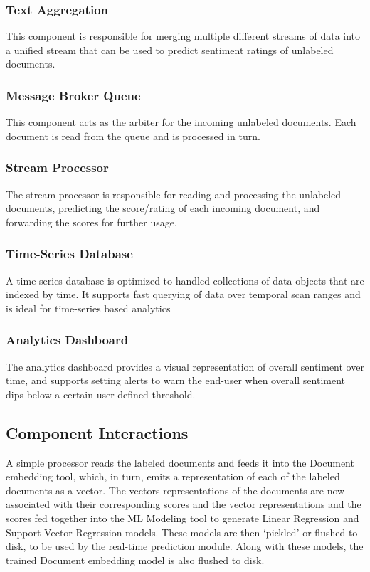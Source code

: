 \documentclass[conference]{IEEEtran}
\begin{document}
        \subsubsection{Text Aggregation}
            This component is responsible for merging multiple different streams of data into a unified stream that can be used to predict sentiment ratings of unlabeled documents.

        \subsubsection{Message Broker Queue}
            This component acts as the arbiter for the incoming unlabeled documents. 
            Each document is read from the queue and is processed in turn.

        \subsubsection{Stream Processor}
            The stream processor is responsible for reading and processing the unlabeled documents, predicting the score/rating of each incoming document, and forwarding the scores for further usage.

        \subsubsection{Time-Series Database}
            A time series database is optimized to handled collections of data objects that are indexed by time. 
            It supports fast querying of data over temporal scan ranges and is ideal for time-series based analytics

        \subsubsection{Analytics Dashboard}
            The analytics dashboard provides a visual representation of overall sentiment over time, and supports setting alerts to warn the end-user when overall sentiment dips below a certain user-defined threshold.

    \subsection{Component Interactions} \label{Component Interactions}
        A simple processor reads the labeled documents and feeds it into the Document embedding tool, which, in turn, emits a representation of each of the labeled documents as a vector.
        The vectors representations of the documents are now associated with their corresponding scores and the vector representations and the scores fed together into the ML Modeling tool to generate Linear Regression and Support Vector Regression models. 
        These models are then `pickled' or flushed to disk, to be used by the real-time prediction module. 
        Along with these models, the trained Document embedding model is also flushed to disk.
\end{document}
